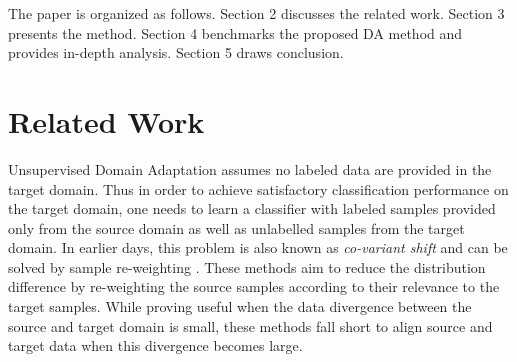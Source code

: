 \documentclass[journal,twocolumn]{IEEEtran}
\newcommand\luo[1]{{\footnotesize \color{blue}[#1 - \textbf{Luo}]}}
\begin{document}
\begin{CJK*}{UTF8}{gkai}



	
The paper is organized as follows. Section 2 discusses the related work. Section 3 presents the method. Section 4 benchmarks the proposed DA method and provides in-depth analysis. Section 5 draws conclusion.   


	\vspace{-5pt} 
\section{Related Work}
Unsupervised Domain Adaptation assumes no labeled data are provided in the target domain. Thus in order to achieve satisfactory classification performance on the target domain, one needs to learn a classifier with labeled samples provided only from the source domain as well as unlabelled samples from the target domain. In earlier days, this problem is also known as \textit{co-variant shift} and can be solved by  sample re-weighting \cite{sugiyama2008direct}. These methods aim to reduce the distribution difference by re-weighting the source samples according to their relevance to the target samples. While proving useful when the data divergence between the source and target domain is small, these methods fall short to align source and target data when this divergence becomes large. 


\end{CJK*}
\end{document}
